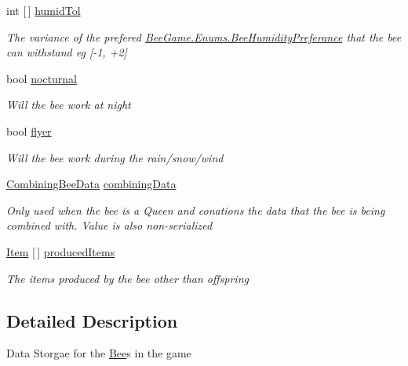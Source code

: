 \begin{DoxyCompactItemize}
int \mbox{[}$\,$\mbox{]} \hyperlink{struct_bee_game_1_1_bee_1_1_bee_data_a7d9953fe200dd4eb57a86db5fd7062e3}{humid\+Tol}
\begin{DoxyCompactList}\small\item\em The variance of the prefered \hyperlink{namespace_bee_game_1_1_enums_a66566cbc9da8d1d1e402156b4bd3bf9d}{Bee\+Game.\+Enums.\+Bee\+Humidity\+Preferance} that the bee can withstand eg \mbox{[}-\/1, +2\mbox{]} \end{DoxyCompactList}\item 
bool \hyperlink{struct_bee_game_1_1_bee_1_1_bee_data_a4cd90eee8d255726d982116f14b444b2}{nocturnal}
\begin{DoxyCompactList}\small\item\em Will the bee work at night \end{DoxyCompactList}\item 
bool \hyperlink{struct_bee_game_1_1_bee_1_1_bee_data_af78a352321613693c3e94c98f655ac63}{flyer}
\begin{DoxyCompactList}\small\item\em Will the bee work during the rain/snow/wind \end{DoxyCompactList}\item 
\hyperlink{struct_bee_game_1_1_bee_1_1_combining_bee_data}{Combining\+Bee\+Data} \hyperlink{struct_bee_game_1_1_bee_1_1_bee_data_ab12331d23b41365d0a1be0d7eba7fa0f}{combining\+Data}
\begin{DoxyCompactList}\small\item\em Only used when the bee is a Queen and conations the data that the bee is being combined with. Value is also non-\/serialized \end{DoxyCompactList}\item 
\hyperlink{struct_bee_game_1_1_items_1_1_item}{Item} \mbox{[}$\,$\mbox{]} \hyperlink{struct_bee_game_1_1_bee_1_1_bee_data_a3c49396295407e1744f501e86c32d61c}{produced\+Items}
\begin{DoxyCompactList}\small\item\em The items produced by the bee other than offspring \end{DoxyCompactList}\end{DoxyCompactItemize}


\subsection{Detailed Description}
Data Storgae for the \hyperlink{namespace_bee_game_1_1_bee}{Bee}\textquotesingle{}s in the game 



